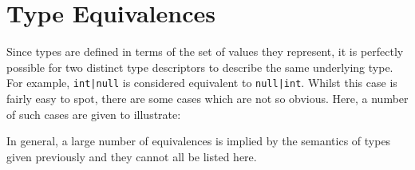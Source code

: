 \section{Type Equivalences}
Since types are defined in terms of the set of values they represent, it is perfectly possible for two distinct type descriptors to describe the same underlying type.  For example, \lstinline{int|null} is considered equivalent to \lstinline{null|int}.  Whilst this case is fairly easy to spot, there are some cases which are not so obvious.  Here, a number of such cases are given to illustrate:

In general, a large number of equivalences is implied by the semantics of types given previously and they cannot all be listed here.
